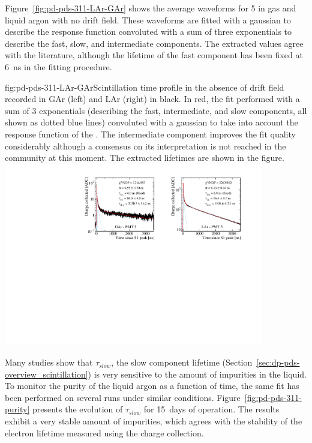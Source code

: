 Figure~\ref{fig:pd-pds-311-LAr-GAr} shows the average waveforms for  5 in gas and liquid argon with no drift field. These waveforms are fitted with a gaussian to describe the response function convoluted with a sum of three exponentials to describe the fast, slow, and intermediate components. 
The extracted values agree with the literature, although the lifetime of the fast component has been fixed at \SI{6}{ns} in the fitting procedure.

\begin{dunefigure}{fig:pd-pds-311-LAr-GAr}{Scintillation time profile in the absence of drift field recorded in GAr (left) and LAr (right) in black. In red, the fit performed with a sum of 3 exponentials (describing the fast, intermediate, and slow components, all shown as dotted blue lines) convoluted with a gaussian to take into account the response function of the . The intermediate component improves the fit quality considerably although a consensus on its interpretation is not reached in the community at this moment. The extracted lifetimes are shown in the figure.}
\includegraphics[width=0.85\textwidth]{graphics/dppd_311_lar_gar_fit.pdf}
\end{dunefigure}

Many studies show that $\tau_{slow}$, the slow component lifetime (Section~\ref{sec:dp-pds-overview_scintillation}) is very sensitive to the amount of impurities in the liquid.
To monitor the purity of the liquid argon as a function of time, the same fit has been performed on several runs under similar conditions. 
Figure~\ref{fig:pd-pds-311-purity} presents the evolution of $\tau_{slow}$ for \SI{15}{days} of operation.
The results exhibit a very stable amount of impurities, which agrees with the stability of the electron lifetime measured using the charge collection.

